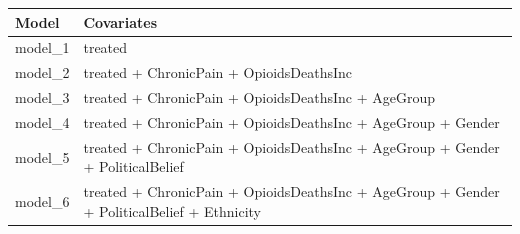 \documentclass[
]{article}
\begin{document}
\begin{longtable}[]{@{}ll@{}}
\toprule
\begin{minipage}[b]{0.35\columnwidth}\raggedright
Model\strut
\end{minipage} & \begin{minipage}[b]{0.59\columnwidth}\raggedright
Covariates\strut
\end{minipage}\tabularnewline
\midrule
\endhead
\begin{minipage}[t]{0.35\columnwidth}\raggedright
model\_1\strut
\end{minipage} & \begin{minipage}[t]{0.59\columnwidth}\raggedright
treated\strut
\end{minipage}\tabularnewline
\begin{minipage}[t]{0.35\columnwidth}\raggedright
model\_2\strut
\end{minipage} & \begin{minipage}[t]{0.59\columnwidth}\raggedright
treated + ChronicPain + OpioidsDeathsInc\strut
\end{minipage}\tabularnewline
\begin{minipage}[t]{0.35\columnwidth}\raggedright
model\_3\strut
\end{minipage} & \begin{minipage}[t]{0.59\columnwidth}\raggedright
treated + ChronicPain + OpioidsDeathsInc + AgeGroup\strut
\end{minipage}\tabularnewline
\begin{minipage}[t]{0.35\columnwidth}\raggedright
model\_4\strut
\end{minipage} & \begin{minipage}[t]{0.59\columnwidth}\raggedright
treated + ChronicPain + OpioidsDeathsInc + AgeGroup + Gender\strut
\end{minipage}\tabularnewline
\begin{minipage}[t]{0.35\columnwidth}\raggedright
model\_5\strut
\end{minipage} & \begin{minipage}[t]{0.59\columnwidth}\raggedright
treated + ChronicPain + OpioidsDeathsInc + AgeGroup + Gender +
PoliticalBelief\strut
\end{minipage}\tabularnewline
\begin{minipage}[t]{0.35\columnwidth}\raggedright
model\_6\strut
\end{minipage} & \begin{minipage}[t]{0.59\columnwidth}\raggedright
treated + ChronicPain + OpioidsDeathsInc + AgeGroup + Gender +
PoliticalBelief + Ethnicity\strut
\end{minipage}\tabularnewline
\bottomrule
\end{longtable}
\end{document}
